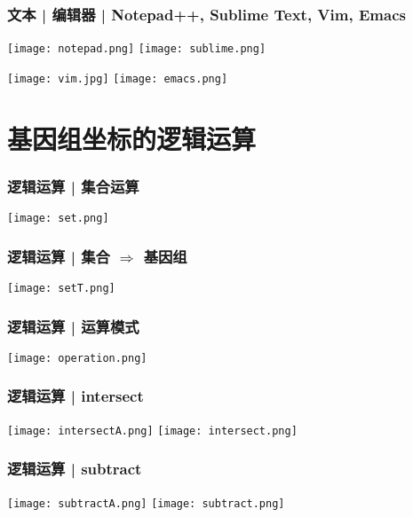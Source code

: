 \documentclass[table]{beamer}
\begin{document}
\begin{frame}
  \frametitle{文本 | 编辑器 | Notepad++, Sublime Text, Vim, Emacs}
      \texttt{[image: notepad.png]} \quad
      \texttt{[image: sublime.png]}

      \texttt{[image: vim.jpg]} \quad
      \texttt{[image: emacs.png]}
\end{frame}

\section{基因组坐标的逻辑运算}
\begin{frame}
  \frametitle{逻辑运算 | 集合运算}
    \begin{center}
      \texttt{[image: set.png]}
    \end{center}
\end{frame}

\begin{frame}
  \frametitle{逻辑运算 | 集合 $\Rightarrow$ 基因组}
    \begin{center}
      \texttt{[image: setT.png]}
    \end{center}
\end{frame}

\begin{frame}
  \frametitle{逻辑运算 | 运算模式}
    \begin{center}
      \texttt{[image: operation.png]}
    \end{center}
\end{frame}

\begin{frame}
  \frametitle{逻辑运算 | intersect}
    \begin{center}
      \texttt{[image: intersectA.png]}
      \vspace{0.5cm}
      \texttt{[image: intersect.png]}
    \end{center}
\end{frame}

\begin{frame}
  \frametitle{逻辑运算 | subtract}
    \begin{center}
      \texttt{[image: subtractA.png]}
      \vspace{0.5cm}
      \texttt{[image: subtract.png]}
    \end{center}
\end{frame}
\end{document}
